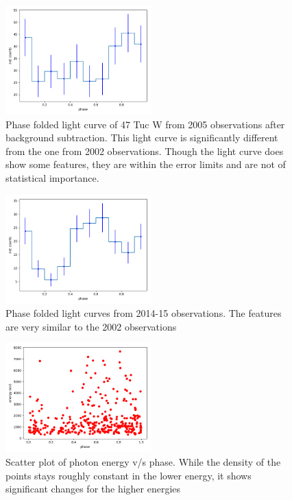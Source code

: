 \documentclass[a4paper,fleqn,usenatbib]{mnras}
\begin{document}
\begin{figure}
 \centering
 \includegraphics[width = 0.5\textwidth]{Figures/2005_1full.png}
 \caption{Phase folded light curve of 47 Tuc W from 2005 observations after background subtraction. This light curve is significantly 
 different from the one from 2002 observations. Though the light curve does show some features, they are within the error limits and 
 are not of statistical importance.}
 \label{fig:2005_full}
\end{figure}

\begin{figure}
 \centering
 \includegraphics[width=0.5\textwidth]{Figures/2015_1filt.png}
 \caption{Phase folded light curves from 2014-15 observations. The features are very similar to the 2002 
 observations}
 \label{fig:2015_full}
\end{figure}

\begin{figure}
\centering
 \includegraphics[width=0.5\textwidth]{Figures/2002_enph.png}
 \caption{Scatter plot of photon energy v/s phase. While the density of the points stays roughly constant in the lower energy,
 it shows significant changes for the higher energies}
 \label{fig:2002enph}
\end{figure}
\end{document}
